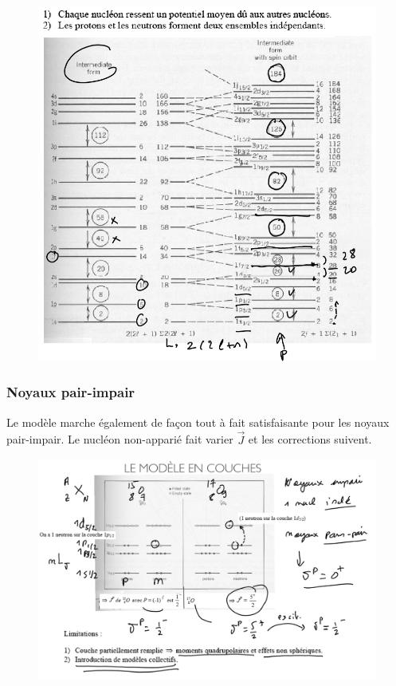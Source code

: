 \begin{figure}[H]
    \centering
    \includegraphics[width=\textwidth]{Images4/spin-orbite.PNG}
\end{figure}
\subsubsection{Noyaux pair-impair}
Le modèle marche également de façon tout à fait satisfaisante pour les noyaux pair-impair. Le nucléon non-apparié fait varier $\vec{J}$ et les corrections suivent.
\begin{figure}[H]
    \centering
    \includegraphics[width=\textwidth]{Images4/pair-impair.PNG}
\end{figure}






